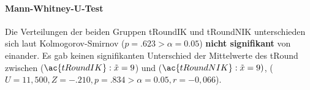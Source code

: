 \documentclass[a4paper,11pt]{article}%
\renewcommand{\\}{\vspace*{0.5\baselineskip} \newline}
\begin{document}
\paragraph{Mann-Whitney-U-Test}
Die Verteilungen der beiden Gruppen \ac{tRoundIK} und \ac{tRoundNIK} unterschieden sich laut Kolmogorov-Smirnov ($p = .623 > \alpha = 0.05$) \textbf{nicht signifikant} von einander. Es gab keinen signifikanten Unterschied der Mittelwerte des \ac{tRound} zwischen ($\ac{tRoundIK} : \tilde x = 9$) und ($\ac{tRoundNIK} : \tilde x = 9)$, ($U = 11,500, Z = -.210, p = .834 > \alpha = 0.05, r = -0,066$).

\end{document}
